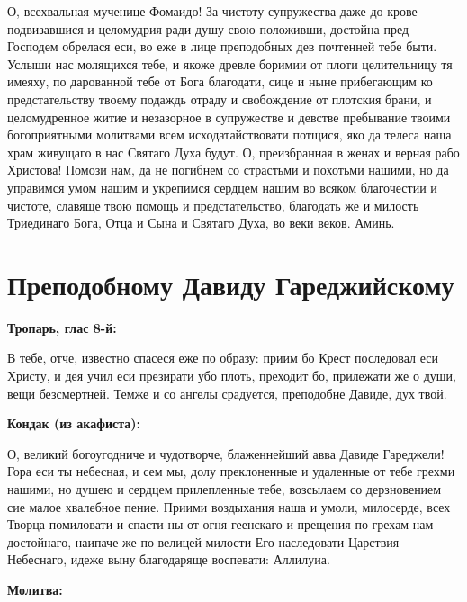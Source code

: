  О, всехвальная мученице Фомаидо! За чистоту супружества даже до крове подвизавшися и целомудрия ради душу свою положивши, достойна пред Господем обрелася еси, во еже в лице преподобных дев почтенней тебе быти. Услыши нас молящихся тебе, и якоже древле боримии от плоти целительницу тя имеяху, по дарованной тебе от Бога благодати, сице и ныне прибегающим ко предстательству твоему подаждь отраду и свобождение от плотския брани, и целомудренное житие и незазорное в супружестве и девстве пребывание твоими богоприятными молитвами всем исходатайствовати потщися, яко да телеса наша храм живущаго в нас Святаго Духа будут. О, преизбранная в женах и верная рабо Христова! Помози нам, да не погибнем со страстьми и похотьми нашими, но да управимся умом нашим и укрепимся сердцем нашим во всяком благочестии и чистоте, славяще твою помощь и предстательство, благодать же и милость Триединаго Бога, Отца и Сына и Святаго Духа, во веки веков. Аминь. 


 

\section{Преподобному Давиду Гареджийскому}
 


\bfseries Тропарь, глас 8-й:\normalfont{}


В тебе, отче, известно спасеся еже по образу: приим бо Крест последовал еси Христу, и дея учил еси презирати убо плоть, преходит бо, прилежати же о души, вещи безсмертней. Темже и со ангелы срадуется, преподобне Давиде, дух твой.


\medskip


\bfseries Кондак (из акафиста):\normalfont{}


О, великий богоугодниче и чудотворче, блаженнейший авва Давиде Гареджели! Гора еси ты небесная, и сем мы, долу преклоненные и удаленные от тебе грехми нашими, но душею и сердцем прилепленные тебе, возсылаем со дерзновением сие малое хвалебное пение. Приими воздыхания наша и умоли, милосерде, всех Творца помиловати и спасти ны от огня геенскаго и прещения по грехам нам достойнаго, наипаче же по велицей милости Его наследовати Царствия Небеснаго, идеже выну благодаряще воспевати: Аллилуиа.


\medskip


\bfseries Молитва:\normalfont{}


